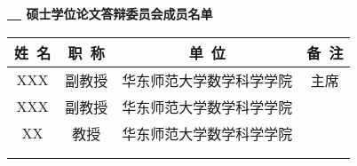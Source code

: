 
\thispagestyle{empty}

\vspace*{2em}


\begin{center}\bfseries{}
 \underline{\ \Candidate \ } 硕士学位论文答辩委员会成员名单
\end{center}


\begin{center}
    \renewcommand{\arraystretch}{1.4}
    \begin{tabular}{|c|c|c|c|} 
        \hline
        姓~名 & 职~称 & 单~位 & 备~注 \\\hline
        XXX & 副教授 &  华东师范大学数学科学学院  & 主席  \\ \hline
        XXX & 副教授 &  华东师范大学数学科学学院  & \\ \hline
        XX  & 教授 & 华东师范大学数学科学学院  &  \\ \hline
        &  &  &  \\ \hline
        &  &  &  \\ \hline
  \end{tabular}
\end{center}

\clearpage{\pagestyle{empty}\cleardoublepage}